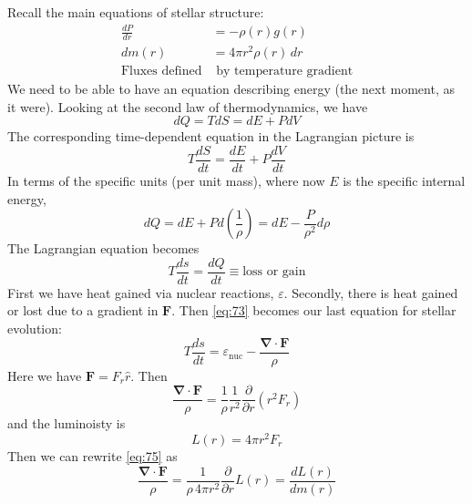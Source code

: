 \documentclass[10pt]{article}
\numberwithin{equation}{section}
\begin{document}
  Recall the main equations of stellar structure:
  \begin{align}
    \label{eq:69}
    \frac{dP}{dr}&=-\rho(r)g(r)\\
    dm(r)&=4\pi r^2\rho(r)\,dr\\
    \nonumber\textrm{Fluxes defined}&\textrm{ by temperature gradient}
  \end{align}
  We need to be able to have an equation describing energy (the next
  moment, as it were). Looking at the second law of thermodynamics, we
  have
  \begin{equation}
    \label{eq:70}
    dQ=TdS=dE+PdV
  \end{equation}
  The corresponding time-dependent equation in the Lagrangian picture is
  \begin{equation}
    \label{eq:71}
    T\frac{dS}{dt}=\frac{dE}{dt}+P\frac{dV}{dt}
  \end{equation}
  In terms of the specific units (per unit mass), where now $E$ is the
  specific internal energy,
  \begin{equation}
    \label{eq:72}
    dQ=dE+Pd\left(\frac{1}{\rho}\right)=dE-\frac{P}{\rho^2}d\rho
  \end{equation}
  The Lagrangian equation becomes
  \begin{equation}
    \label{eq:73}
    T\frac{ds}{dt}=\frac{dQ}{dt}\equiv\textrm{loss or gain}
  \end{equation}
  First we have heat gained via nuclear reactions,
  $\varepsilon$. Secondly, there is heat gained or lost due to a
  gradient in $\mathbf{F}$. Then \eqref{eq:73} becomes our last equation
  for stellar evolution:
  \begin{equation}
    \label{eq:74}
    \boxed{T\frac{ds}{dt}=\varepsilon_{\mathrm{nuc}}-\frac{\bm{\nabla}\cdot
\mathbf{F}}{\rho}}
  \end{equation}
  Here we have $\mathbf{F}=F_r\hat{r}$. Then
  \begin{equation}
    \label{eq:75}
    \frac{\bm{\nabla}\cdot\mathbf{F}}{\rho}=\frac{1}{\rho}\frac{1}
{r^2}\frac{\partial}{\partial
      r}\left(r^2F_r\right)
  \end{equation}
  and the luminoisty is
  \begin{equation}
    \label{eq:76}
    L(r)=4\pi r^2F_r
  \end{equation}
  Then we can rewrite \eqref{eq:75} as
  \begin{equation}
    \label{eq:77}
    \frac{\bm{\nabla}\cdot\mathbf{F}}{\rho}=\frac{1}{\rho\,4\pi
      r^2}\frac{\partial}{\partial r}L(r)=\frac{d L(r)}{dm(r)}
  \end{equation}
\end{document}
